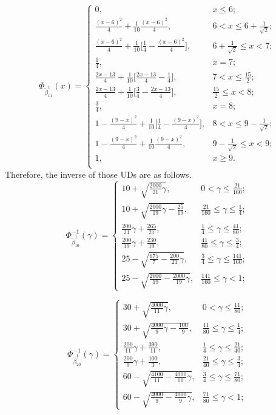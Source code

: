 \[\Phi_{\tilde{\beta}_{11}^1}(x)=\left\{
\begin{array}{ll}
	0, & x\leq 6;\\
	\frac{(x-6)^2}{4}+\frac{1}{10}\frac{(x-6)^2}{4}, & 6<x\leq 6+\frac{1}{\sqrt{2}};\\
	\frac{(x-6)^2}{4}+\frac{1}{10}\big[\frac{1}{4}-\frac{(x-6)^2}{4}\big], & 6+\frac{1}{\sqrt{2}}\leq x<7;\\
	\frac{1}{4}, & x=7;\\
	\frac{2x-13}{4}+\frac{1}{10}\big[\frac{2x-13}{4}-\frac{1}{4}\big], & 7< x\leq \frac{15}{2};\\
	\frac{2x-13}{4}+\frac{1}{10}\big[\frac{3}{4}-\frac{2x-13}{4}\big], & \frac{15}{2}\leq x<8;\\
	\frac{3}{4}, & x=8;\\
	1-\frac{(9-x)^2}{4}+\frac{1}{10}\big[\frac{1}{4}-\frac{(9-x)^2}{4}\big], & 8<x\leq 9-\frac{1}{\sqrt{2}};\\
	1-\frac{(9-x)^2}{4}+\frac{1}{10}\frac{(9-x)^2}{4}, &  9-\frac{1}{\sqrt{2}}\leq x<9;\\
	1, & x\geq 9.\\
\end{array}
\right.
\]   
Therefore, the inverse of those UDs are as follows.
\[\Phi_{\tilde{\beta}_{10}^1}^{-1}(\gamma)=\left\{
\begin{array}{ll}
	10+\sqrt{\frac{2000}{21}\gamma}, & 0<\gamma\leq \frac{21}{160};\\
	10+\sqrt{\frac{2000}{19}\gamma-\frac{25}{19}}, & \frac{21}{160}\leq\gamma\leq \frac{1}{4};\\
	\frac{200}{21}\gamma+\frac{265}{21}, &\frac{1}{4}\leq \gamma\leq \frac{41}{80};\\
	\frac{200}{19}\gamma+\frac{230}{19}, &\frac{41}{80}\leq \gamma\leq \frac{3}{4};\\
	25-\sqrt{\frac{675}{7}-\frac{200}{21}\gamma}, & \frac{3}{4}\leq\gamma\leq \frac{141}{160};\\
	25-\sqrt{\frac{2000}{19}-\frac{2000}{19}\gamma}, & \frac{141}{160}\leq\gamma<1;
\end{array}
\right.
\]

\[\Phi_{\tilde{\beta}_{20}^1}^{-1}(\gamma)=\left\{
\begin{array}{ll}
30+\sqrt{\frac{4000}{11}\gamma}, & 0<\gamma\leq \frac{11}{80};\\
30+\sqrt{\frac{4000}{9}\gamma-\frac{100}{9}}, & \frac{11}{80}\leq\gamma\leq \frac{1}{4};\\
\frac{200}{11}\gamma+\frac{390}{11}, &\frac{1}{4}\leq \gamma\leq \frac{21}{40};\\
\frac{200}{9}\gamma+\frac{100}{3}, &\frac{21}{40}\leq \gamma\leq \frac{3}{4};\\
60-\sqrt{\frac{4100}{11}-\frac{4000}{11}\gamma}, & \frac{3}{4}\leq\gamma\leq \frac{71}{80};\\
60-\sqrt{\frac{4000}{9}-\frac{4000}{9}\gamma}, & \frac{71}{80}\leq\gamma<1;
\end{array}
\right.
\]

